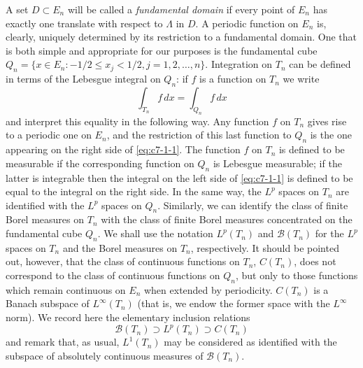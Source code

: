 A set $D \subset E_n$ will be called a \emph{fundamental domain} if every point of $E_n$ has exactly one translate with respect to $\Lambda$ in $D$. A periodic function on $E_n$ is, clearly, uniquely determined by its restriction to a fundamental domain. One that is both simple and appropriate for our purposes is the fundamental cube $Q_n = \{x \in E_n : -1/2 \leq x_j < 1/2, j = 1, 2, \dots, n\}$. Integration on $T_n$ can be defined in terms of the Lebesgue integral on $Q_n$: if $f$ is a function on $T_n$ we write
\begin{equation}\label{eq:c7-1-1}
\int_{T_n} f\,dx = \int_{Q_n} f\,dx
\end{equation}
and interpret this equality in the following way. Any function $f$ on $T_n$ gives rise to a periodic one on $E_n$, and the restriction of this last function to $Q_n$ is the one appearing on the right side of \eqref{eq:c7-1-1}. The function $f$ on $T_n$ is defined to be measurable if the corresponding function on $Q_n$ is Lebesgue measurable; if the latter is integrable then the integral on the left side of \eqref{eq:c7-1-1} is defined to be equal to the integral on the right side. In the same way, the $L^p$ spaces on $T_n$ are identified with the $L^p$ spaces on $Q_n$. Similarly, we can identify the class of finite Borel measures on $T_n$ with the class of finite Borel measures concentrated on the fundamental cube $Q_n$. We shall use the notation $L^p(T_n)$ and $\mathcal{B}(T_n)$ for the $L^p$ spaces on $T_n$ and the Borel measures on $T_n$, respectively. It should be pointed out, however, that the class of continuous functions on $T_n$, $C(T_n)$, does not correspond to the class of continuous functions on $Q_n$, but only to those functions which remain continuous on $E_n$ when extended by periodicity. $C(T_n)$ is a Banach subspace of $L^\infty(T_n)$ (that is, we endow the former space with the $L^\infty$ norm). We record here the elementary inclusion relations
\[
\mathcal{B}(T_n) \supset L^p(T_n) \supset C(T_n)
\]
and remark that, as usual, $L^1(T_n)$ may be considered as identified with the subspace of absolutely continuous measures of $\mathcal{B}(T_n)$.

